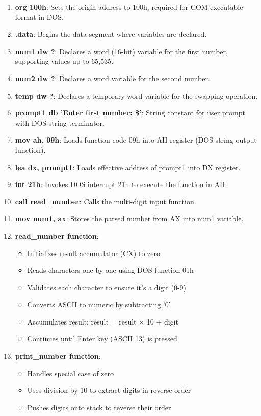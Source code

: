 \documentclass[12pt,a4paper]{article}
\begin{document}
\begin{enumerate}
\item \textbf{org 100h}: Sets the origin address to 100h, required for COM executable format in DOS.
\item \textbf{.data}: Begins the data segment where variables are declared.
\item \textbf{num1 dw ?}: Declares a word (16-bit) variable for the first number, supporting values up to 65,535.
\item \textbf{num2 dw ?}: Declares a word variable for the second number.
\item \textbf{temp dw ?}: Declares a temporary word variable for the swapping operation.
\item \textbf{prompt1 db 'Enter first number: \$'}: String constant for user prompt with DOS string terminator.
\item \textbf{mov ah, 09h}: Loads function code 09h into AH register (DOS string output function).
\item \textbf{lea dx, prompt1}: Loads effective address of prompt1 into DX register.
\item \textbf{int 21h}: Invokes DOS interrupt 21h to execute the function in AH.
\item \textbf{call read\_number}: Calls the multi-digit input function.
\item \textbf{mov num1, ax}: Stores the parsed number from AX into num1 variable.
\item \textbf{read\_number function}: 
    \begin{itemize}
    \item Initializes result accumulator (CX) to zero
    \item Reads characters one by one using DOS function 01h
    \item Validates each character to ensure it's a digit (0-9)
    \item Converts ASCII to numeric by subtracting '0'
    \item Accumulates result: result = result × 10 + digit
    \item Continues until Enter key (ASCII 13) is pressed
    \end{itemize}
\item \textbf{print\_number function}:
    \begin{itemize}
    \item Handles special case of zero
    \item Uses division by 10 to extract digits in reverse order
    \item Pushes digits onto stack to reverse their order

\end{itemize}
\end{enumerate}
\end{document}
